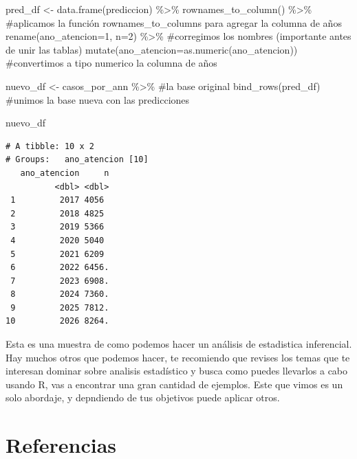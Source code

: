 \documentclass[
  letterpaper,
  DIV=11,
  numbers=noendperiod]{scrreprt}
\newenvironment{Shaded}{\begin{snugshade}}{\end{snugshade}}
\newcommand{\AttributeTok}[1]{\textcolor[rgb]{0.40,0.45,0.13}{#1}}
\newcommand{\CommentTok}[1]{\textcolor[rgb]{0.37,0.37,0.37}{#1}}
\newcommand{\DecValTok}[1]{\textcolor[rgb]{0.68,0.00,0.00}{#1}}
\newcommand{\FunctionTok}[1]{\textcolor[rgb]{0.28,0.35,0.67}{#1}}
\newcommand{\NormalTok}[1]{\textcolor[rgb]{0.00,0.23,0.31}{#1}}
\newcommand{\OtherTok}[1]{\textcolor[rgb]{0.00,0.23,0.31}{#1}}
\newcommand{\SpecialCharTok}[1]{\textcolor[rgb]{0.37,0.37,0.37}{#1}}
\newlength{\cslhangindent}
\newenvironment{CSLReferences}[2] %
 {\begin{list}{}{%
  \setlength{\itemindent}{0pt}
  \setlength{\leftmargin}{0pt}
  \setlength{\parsep}{0pt}
  \ifodd #1
   \setlength{\leftmargin}{\cslhangindent}
   \setlength{\itemindent}{-1\cslhangindent}
  \fi
  \setlength{\itemsep}{#2\baselineskip}}}
 {\end{list}}
\begin{document}
\begin{Shaded}
\begin{Highlighting}[]
\NormalTok{pred\_df }\OtherTok{\textless{}{-}} \FunctionTok{data.frame}\NormalTok{(prediccion) }\SpecialCharTok{\%\textgreater{}\%} 
  \FunctionTok{rownames\_to\_column}\NormalTok{() }\SpecialCharTok{\%\textgreater{}\%}  \CommentTok{\#aplicamos la función rownames\_to\_columns para agregar la columna de años}
  \FunctionTok{rename}\NormalTok{(}\AttributeTok{ano\_atencion=}\DecValTok{1}\NormalTok{, }\AttributeTok{n=}\DecValTok{2}\NormalTok{) }\SpecialCharTok{\%\textgreater{}\%}  \CommentTok{\#corregimos los nombres (importante antes de unir las tablas)}
  \FunctionTok{mutate}\NormalTok{(}\AttributeTok{ano\_atencion=}\FunctionTok{as.numeric}\NormalTok{(ano\_atencion)) }\CommentTok{\#convertimos a tipo numerico la columna de años}

\NormalTok{nuevo\_df }\OtherTok{\textless{}{-}}\NormalTok{ casos\_por\_ann }\SpecialCharTok{\%\textgreater{}\%}  \CommentTok{\#la base original}
  \FunctionTok{bind\_rows}\NormalTok{(pred\_df) }\CommentTok{\#unimos la base nueva con las predicciones}

\NormalTok{nuevo\_df}
\end{Highlighting}
\end{Shaded}

\begin{verbatim}
# A tibble: 10 x 2
# Groups:   ano_atencion [10]
   ano_atencion     n
          <dbl> <dbl>
 1         2017 4056 
 2         2018 4825 
 3         2019 5366 
 4         2020 5040 
 5         2021 6209 
 6         2022 6456.
 7         2023 6908.
 8         2024 7360.
 9         2025 7812.
10         2026 8264.
\end{verbatim}

Esta es una muestra de como podemos hacer un análisis de estadistica
inferencial. Hay muchos otros que podemos hacer, te recomiendo que
revises los temas que te interesan dominar sobre analisis estadístico y
busca como puedes llevarlos a cabo usando R, vas a encontrar una gran
cantidad de ejemplos. Este que vimos es un solo abordaje, y depndiendo
de tus objetivos puede aplicar otros.


\chapter*{Referencias}\label{referencias}


\label{refs}
\begin{CSLReferences}{0}{1}
\end{CSLReferences}
\end{document}
